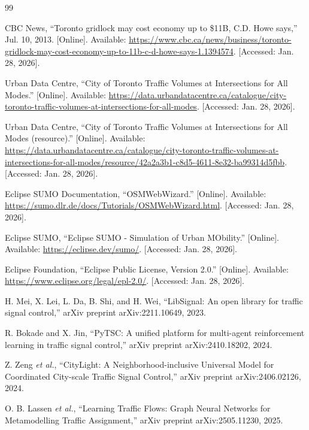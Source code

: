 \documentclass[10pt,twocolumn]{article}
\begin{document}
\newpage
\small
\begin{thebibliography}{99}

CBC News, ``Toronto gridlock may cost economy up to \$11B, C.D. Howe says,'' Jul. 10, 2013. [Online]. Available: \url{https://www.cbc.ca/news/business/toronto-gridlock-may-cost-economy-up-to-11b-c-d-howe-says-1.1394574}. [Accessed: Jan. 28, 2026].

Urban Data Centre, ``City of Toronto Traffic Volumes at Intersections for All Modes.'' [Online]. Available: \url{https://data.urbandatacentre.ca/catalogue/city-toronto-traffic-volumes-at-intersections-for-all-modes}. [Accessed: Jan. 28, 2026].

Urban Data Centre, ``City of Toronto Traffic Volumes at Intersections for All Modes (resource).'' [Online]. Available: \url{https://data.urbandatacentre.ca/catalogue/city-toronto-traffic-volumes-at-intersections-for-all-modes/resource/42a2a3b1-c8d5-4611-8e32-ba99314d5fbb}. [Accessed: Jan. 28, 2026].

Eclipse SUMO Documentation, ``OSMWebWizard.'' [Online]. Available: \url{https://sumo.dlr.de/docs/Tutorials/OSMWebWizard.html}. [Accessed: Jan. 28, 2026].

Eclipse SUMO, ``Eclipse SUMO - Simulation of Urban MObility.'' [Online]. Available: \url{https://eclipse.dev/sumo/}. [Accessed: Jan. 28, 2026].

Eclipse Foundation, ``Eclipse Public License, Version 2.0.'' [Online]. Available: \url{https://www.eclipse.org/legal/epl-2.0/}. [Accessed: Jan. 28, 2026].

H. Mei, X. Lei, L. Da, B. Shi, and H. Wei, ``LibSignal: An open library for traffic signal control,'' arXiv preprint arXiv:2211.10649, 2023.

R. Bokade and X. Jin, ``PyTSC: A unified platform for multi-agent reinforcement learning in traffic signal control,'' arXiv preprint arXiv:2410.18202, 2024.

Z. Zeng \textit{et al.}, ``CityLight: A Neighborhood-inclusive Universal Model for Coordinated City-scale Traffic Signal Control,'' arXiv preprint arXiv:2406.02126, 2024.

O. B. Lassen \textit{et al.}, ``Learning Traffic Flows: Graph Neural Networks for Metamodelling Traffic Assignment,'' arXiv preprint arXiv:2505.11230, 2025.


\end{thebibliography}
\end{document}
